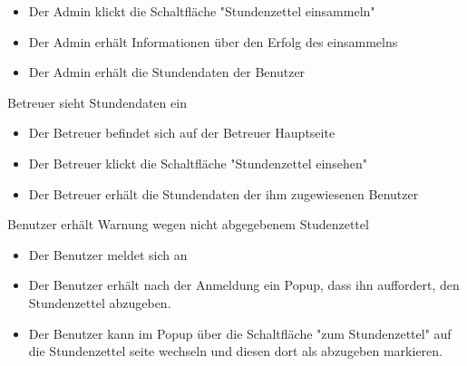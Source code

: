 \begin{requirements}
\begin{itemize}
		\item Der Admin klickt die Schaltfläche "Stundenzettel einsammeln"
		\item Der Admin erhält Informationen über den Erfolg des einsammelns
		\item Der Admin erhält die Stundendaten der Benutzer
	\end {itemize}
\item Betreuer sieht Stundendaten ein
	\begin{itemize}
		\item Der Betreuer befindet sich auf der Betreuer Hauptseite
		\item Der Betreuer klickt die Schaltfläche "Stundenzettel einsehen"
		\item Der Betreuer erhält die Stundendaten der ihm zugewiesenen Benutzer
	\end {itemize}
\item Benutzer erhält Warnung wegen nicht abgegebenem Studenzettel
            \begin{itemize}
		\item Der Benutzer meldet sich an
		\item Der Benutzer erhält nach der Anmeldung ein Popup, dass ihn auffordert, den Stundenzettel abzugeben.
		\item Der Benutzer kann im Popup über die Schaltfläche "zum Stundenzettel" auf die Stundenzettel seite wechseln und diesen dort als abzugeben markieren.
	\end {itemize}

\end{requirements}